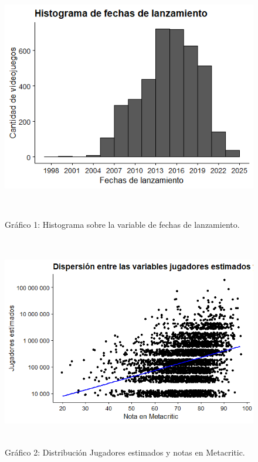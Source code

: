 \documentclass[
  letterpaper,
  DIV=11,
  numbers=noendperiod]{scrreprt}
\begin{document}
\begin{figure}

{\centering \includegraphics[width=137mm,height=108mm]{./imagenes/HistogramaFechasLanzamiento.png}

}

\caption{Gráfico 1: Histograma sobre la variable de fechas de
lanzamiento.}

\end{figure}

\begin{figure}

{\centering \includegraphics[width=138mm,height=93mm]{./imagenes/GamersAndCriticsRelations.png}

}

\caption{Gráfico 2: Distribución Jugadores estimados y notas en
Metacritic.}

\end{figure}
\end{document}
